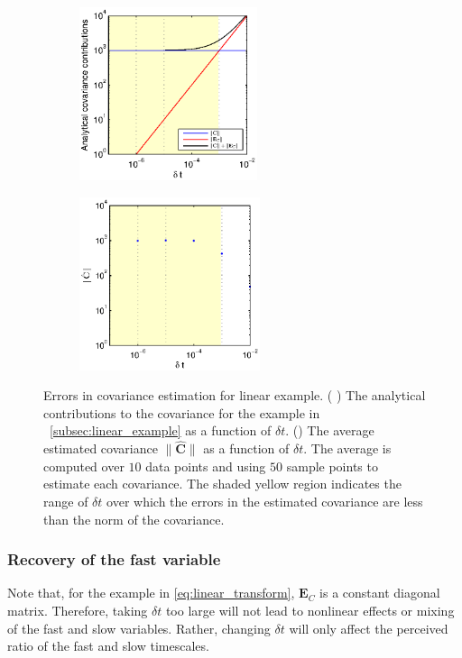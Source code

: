 \begin{figure}[t]
\centering
\begin{subfigure}{0.4\textwidth}
\centering
\includegraphics[height=2in]{C_dt_analytical_linear}
\caption{}
\label{subfig:cov_error1}
\end{subfigure}
%
\begin{subfigure}{0.4\textwidth}
\centering
\includegraphics[height=2in]{C_dt_linear}
\caption{}
\label{subfig:cov_error2}
\end{subfigure}
%
\caption[Errors in covariance estimation for linear multiscale example]{Errors in covariance estimation for linear example. (
) The analytical contributions to the covariance for the example in \sec~\ref{subsec:linear_example} as a function of $\delta t$. () The average estimated covariance $\| \widehat{ \mathbf{C}} \|$ as a function of $\delta t$. The average is computed over $10$ data points and using $50$ sample points to estimate each covariance. The shaded yellow region indicates the range of $\delta t$ over which the errors in the estimated covariance are less than the norm of the covariance. }
\label{fig:cov_error}
\end{figure}

\subsubsection{Recovery of the fast variable} \label{subsec:fastvar}

Note that, for the example in \eqref{eq:linear_transform}, $\mathbf{E}_C$ is a constant diagonal matrix.
%
Therefore, taking $\delta t$ too large will not lead to nonlinear effects or mixing of the fast and slow variables.
%
Rather, changing $\delta t$ will only affect the perceived ratio of the fast and slow timescales.

